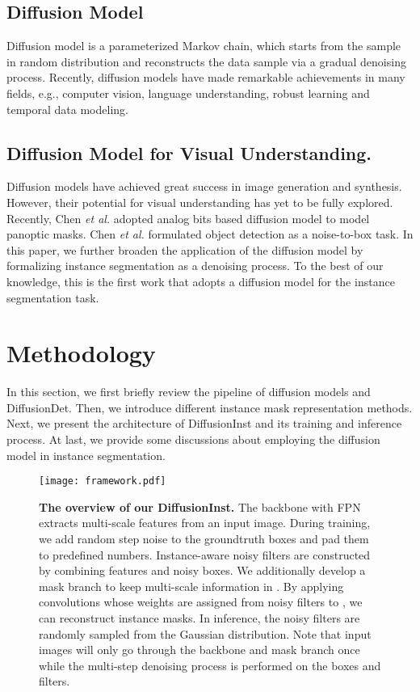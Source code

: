 \documentclass{article}
\begin{document}
\subsection{Diffusion Model}
Diffusion model\cite{DDPM,SGM,GMDD} is a parameterized Markov chain, which starts from the sample in random distribution and reconstructs the data sample via a gradual denoising process. Recently, diffusion models have made remarkable achievements in many fields, e.g., computer vision\cite{CascadedDiff,LDM,LDEM,3DDiff}, language understanding\cite{DiffLM,D3PM,Diffuseq}, robust learning\cite{GDM_Adv,DiffPure} and temporal data modeling\cite{NMC_SDE,DiffWave}.

\subsection{Diffusion Model for Visual Understanding.}
Diffusion models have achieved great success in image generation and synthesis\cite{Prafullanips,DDPM,GMDD}. However, their potential for visual understanding has yet to be fully explored. Recently, Chen \textit{et al.}\cite{DiffSeg} adopted analog bits based diffusion model\cite{BitDiff} to model panoptic masks. Chen \textit{et al.}\cite{DiffusionDet} formulated object detection as a noise-to-box task. In this paper, we further broaden the application of the diffusion model by formalizing instance segmentation as a denoising process. To the best of our knowledge, this is the first work that adopts a diffusion model for the instance segmentation task.

\section{Methodology}
In this section, we first briefly review the pipeline of diffusion models and DiffusionDet\cite{DiffusionDet}. Then, we introduce different instance mask representation methods. Next, we present the architecture of DiffusionInst and its training and inference process. At last, we provide some discussions about employing the diffusion model in instance segmentation.
\begin{figure*}[t]
\centering
\texttt{[image: framework.pdf]}
\caption{\textbf{The overview of our DiffusionInst.} The backbone with FPN extracts multi-scale features from an input image. During training, we add random  step noise to the groundtruth boxes and pad them to predefined numbers. Instance-aware noisy filters are constructed by combining features and noisy boxes. We additionally develop a mask branch to keep multi-scale information in . By applying convolutions whose weights are assigned from noisy filters  to , we can reconstruct instance masks. In inference, the noisy filters are randomly sampled from the Gaussian distribution. Note that input images will only go through the backbone and mask branch once while the multi-step denoising process is performed on the boxes and filters.}
\label{framework}
\end{figure*}
\end{document}
